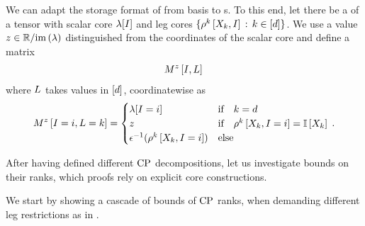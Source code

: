 \begin{remark}
    \label{rem:matStorageBasPlus}
    We can adapt the storage format of  from basis to \basplusDecomposition{}s.
    To this end, let there be a \basplusDecomposition{} of a tensor with scalar core $\lambda[I]$ and leg cores $\{\rho^{k}\left[X_{k},I\right] \,:\, k\in[d]\}$.
    We use a value $z\in\mathbb{R}/\mathrm{im}\left(\lambda\right)$ distinguished from the coordinates of the scalar core and define a matrix
    \begin{align*}
        M^{z}\left[I,L\right] \,
    \end{align*}
    where $L$ takes values in $[d]$, coordinatewise as
    \begin{align*}
        M^{z}\left[I=i,L=k\right] =
        \begin{cases}
            \lambda[I=i] & \text{if}\quad k = d \\
            z & \text{if}\quad \rho^{k}\left[X_{k},I=i\right] = \mathbb{I}\left[X_{k}\right] \\
            \epsilon^{-1}(\rho^{k}\left[X_{k},I=i\right]) & \text{else}
        \end{cases} \, .
    \end{align*}
\end{remark}




After having defined different $\mathrm{CP}$ decompositions, let us investigate bounds on their ranks, which proofs rely on explicit core constructions.




We start by showing a cascade of bounds of $\mathrm{CP}$ ranks, when demanding different leg restrictions as in .

